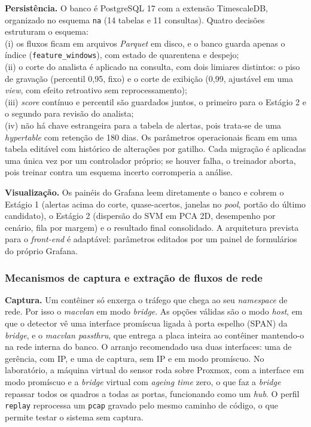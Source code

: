 \documentclass[a4paper,10pt, twocolumn]{article}
\begin{document}
\textbf{Persistência.} O banco é PostgreSQL 17 com a extensão TimescaleDB,
organizado no esquema \texttt{na} (14 tabelas e 11 consultas). Quatro
decisões estruturam o esquema:\\ (i) os fluxos ficam em arquivos \textit{Parquet} em disco, e o banco guarda apenas o índice (\texttt{feature\_windows}), com estado de quarentena e despejo;\\ (ii) o corte do
analista é aplicado na consulta, com dois limiares distintos: o
piso de gravação (percentil 0,95, fixo) e o corte de exibição (0,99, ajustável em
uma \textit{view}, com efeito retroativo sem reprocessamento);\\ (iii) \textit{score} contínuo e
percentil são guardados juntos, o primeiro para o Estágio 2 e o segundo para revisão do 
analista;\\ (iv) não há chave estrangeira para a tabela de alertas, pois trata-se de uma
\textit{hypertable} com retenção de 180 dias. Os parâmetros operacionais ficam em uma
tabela editável com histórico de alterações por gatilho. Cada migração é
aplicadas uma única vez por um controlador próprio; se houver falha, o treinador aborta, pois treinar contra um
esquema incerto corromperia a análise.

\textbf{Visualização.} Os painéis do Grafana leem diretamente o banco e cobrem o
Estágio 1 (alertas acima do corte, quase-acertos, janelas no \textit{pool}, portão do
último candidato), o Estágio 2 (dispersão do SVM em PCA 2D, desempenho por cenário,
fila por margem) e o resultado final consolidado. A arquitetura prevista para o
\textit{front-end} é adaptável: parâmetros editados por um painel de formulários do
próprio Grafana.

\subsubsection{Mecanismos de captura e extração de fluxos de rede}

\textbf{Captura.} Um contêiner só enxerga o tráfego que chega ao seu
\textit{namespace} de rede. Por isso o \textit{macvlan} em modo \textit{bridge}. As opções válidas são o modo \textit{host}, em
que o detector vê uma interface promíscua ligada à porta espelho (SPAN) da
\textit{bridge}, e o \textit{macvlan passthru}, que entrega a placa inteira ao contêiner
mantendo-o na rede interna do banco. O arranjo recomendado usa duas interfaces:
uma de gerência, com IP, e uma de captura, sem IP e em modo promíscuo. No
laboratório, a máquina virtual do sensor roda sobre Proxmox, com a interface em
modo promíscuo e a \textit{bridge} virtual com \textit{ageing time} zero, o que faz a
\textit{bridge} repassar todos os quadros a todas as portas, funcionando como um \textit{hub}.
O perfil \texttt{replay} reprocessa um \texttt{pcap} gravado pelo mesmo caminho de
código, o que permite testar o sistema sem captura.
\end{document}
